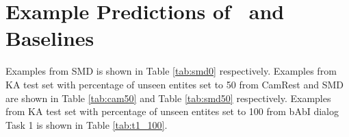 \section{Example Predictions of \sys\ and Baselines}
\label{sec:examples}
Examples from SMD is shown in Table \ref{tab:smd0} respectively. Examples from KA test set with percentage of unseen entites set to 50 from CamRest and SMD are shown in Table \ref{tab:cam50} and Table \ref{tab:smd50} respectively. Examples from KA test set with percentage of unseen entites set to 100 from bAbI dialog Task 1 is shown in Table \ref{tab:t1_100}.




